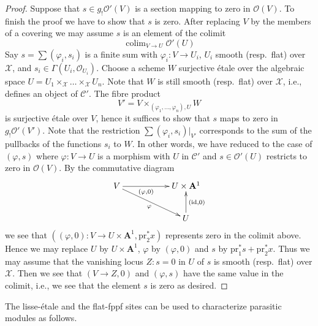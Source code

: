 \documentclass{stacks-project}
\theoremstyle{plain}
\theoremstyle{definition}
\theoremstyle{remark}
\numberwithin{equation}{subsection}
\def\colim{\mathop{\mathrm{colim}}\nolimits}
\begin{document}
\begin{proof}
\medskip\noindent
Suppose that $s \in g_!\mathcal{O}'(V)$ is a section
mapping to zero in $\mathcal{O}(V)$. To finish the proof we have to show
that $s$ is zero. After replacing $V$ by the members
of a covering we may assume $s$ is an element of the colimit
$$
\colim_{V \to U} \mathcal{O}'(U)
$$
Say $s = \sum (\varphi_i, s_i)$ is a finite sum with
$\varphi_i : V \to U_i$, $U_i$ smooth (resp.\ flat) over $\mathcal{X}$, and
$s_i \in \Gamma(U_i, \mathcal{O}_{U_i})$. Choose a scheme $W$ surjective
\'etale over the algebraic space
$U = U_1 \times_\mathcal{X} \ldots \times_\mathcal{X} U_n$.
Note that $W$ is still smooth (resp.\ flat) over $\mathcal{X}$, i.e.,
defines an object of $\mathcal{C}'$. The fibre product
$$
V' = V \times_{(\varphi_1, \ldots, \varphi_n), U} W
$$
is surjective \'etale over $V$, hence it suffices to show that $s$ maps
to zero in $g_!\mathcal{O}'(V')$. Note that the restriction
$\sum (\varphi_i, s_i)|_{V'}$ corresponds to the sum of the pullbacks
of the functions $s_i$ to $W$. In other words, we have reduced to the case
of $(\varphi, s)$ where $\varphi : V \to U$ is a morphism with $U$ in
$\mathcal{C}'$ and $s \in \mathcal{O}'(U)$ restricts to zero in
$\mathcal{O}(V)$. By the commutative diagram
$$
\xymatrix{
V \ar[rr]_-{(\varphi, 0)} \ar[rrd]_\varphi & & U \times \mathbf{A}^1 \\
& & U \ar[u]_{(\text{id}, 0)}
}
$$
we see that
$((\varphi, 0) : V \to U \times \mathbf{A}^1, \text{pr}_2^*x)$
represents zero in the colimit above. Hence we may
replace $U$ by $U \times \mathbf{A}^1$, $\varphi$ by $(\varphi, 0)$
and $s$ by $\text{pr}_1^*s + \text{pr}_2^*x$. Thus we may assume that
the vanishing locus $Z : s = 0$ in $U$ of $s$ is smooth (resp.\ flat)
over $\mathcal{X}$. Then we see that $(V \to Z, 0)$ and $(\varphi, s)$
have the same value in the colimit, i.e., we see that the element $s$
is zero as desired.
\end{proof}

\noindent
The lisse-\'etale and the flat-fppf sites can be used to characterize
parasitic modules as follows.
\end{document}
